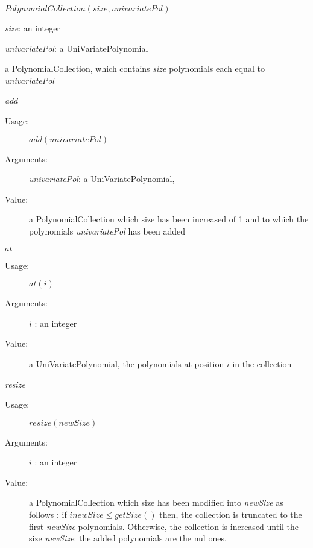 \begin{description}

\item[Usage:] $PolynomialCollection(size, univariatePol)$

\item[Arguments:]  \rule{0pt}{1em}
\begin{description}
\item \textit{size}: an integer
\item \textit{univariatePol}: a UniVariatePolynomial
\end{description}

\item[Value:] a PolynomialCollection, which contains \textit{size} polynomials each equal to  \textit{univariatePol}

\item[Some methods :]  \rule{0pt}{1em}

\item \textit{add}
\begin{description}
\item[Usage:]  $add(univariatePol)$
\item[Arguments:] \textit{univariatePol}: a UniVariatePolynomial,
\item[Value:] a PolynomialCollection which size has been increased of 1 and to which the polynomials \textit{univariatePol} has been added
\end{description}
\bigskip

\item $at$
\begin{description}
\item[Usage:]  $at(i)$
\item[Arguments:] $i$ : an integer
\item[Value:] a UniVariatePolynomial, the polynomials at position $i$ in the collection
\end{description}
\bigskip

\item \textit{resize}
\begin{description}
\item[Usage:]  $resize(newSize)$
\item[Arguments:] $i$ : an integer
\item[Value:] a PolynomialCollection which size has been modified into \textit{newSize} as follows : if $inewSize \leq getSize()$ then, the collection is truncated to the first \textit{newSize} polynomials. Otherwise, the collection is increased until the size \textit{newSize}: the added polynomials are the nul ones.
\end{description}


\end{description}




